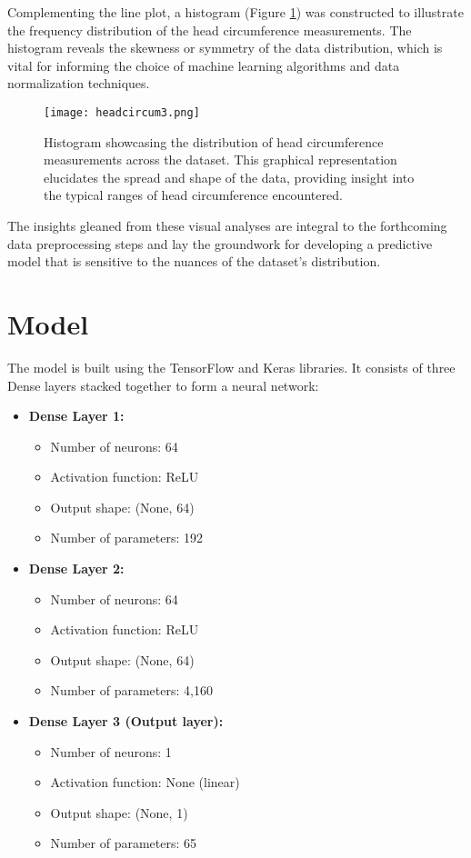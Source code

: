 \documentclass{report}
\begin{document}
Complementing the line plot, a histogram (Figure \ref{fig:histogram}) was constructed to illustrate the frequency distribution of the head circumference measurements. The histogram reveals the skewness or symmetry of the data distribution, which is vital for informing the choice of machine learning algorithms and data normalization techniques.

\begin{figure}[htbp]
  \centering
  \texttt{[image: headcircum3.png]}
  \caption{Histogram showcasing the distribution of head circumference measurements across the dataset. This graphical representation elucidates the spread and shape of the data, providing insight into the typical ranges of head circumference encountered.}
  \label{fig:histogram}
\end{figure}

The insights gleaned from these visual analyses are integral to the forthcoming data preprocessing steps and lay the groundwork for developing a predictive model that is sensitive to the nuances of the dataset's distribution.

\section{Model}
The model is built using the TensorFlow and Keras libraries. It consists of three Dense layers stacked together to form a neural network:

\begin{itemize}
    \item \textbf{Dense Layer 1:}
    \begin{itemize}
        \item Number of neurons: 64
        \item Activation function: ReLU
        \item Output shape: (None, 64)
        \item Number of parameters: 192
    \end{itemize}
    
    \item \textbf{Dense Layer 2:}
    \begin{itemize}
        \item Number of neurons: 64
        \item Activation function: ReLU
        \item Output shape: (None, 64)
        \item Number of parameters: 4,160
    \end{itemize}
    
    \item \textbf{Dense Layer 3 (Output layer):}
    \begin{itemize}
        \item Number of neurons: 1
        \item Activation function: None (linear)
        \item Output shape: (None, 1)
        \item Number of parameters: 65
    \end{itemize}
\end{itemize}
\end{document}
